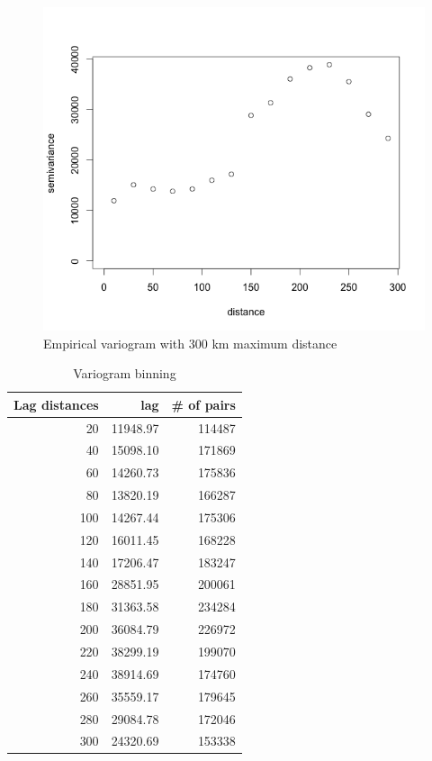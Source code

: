 \documentclass[12pt,twoside]{reedthesis}
\begin{document}
\begin{figure}[h!]
	   
	       \centering
	  
	    \includegraphics[scale=0.6]{Variogram}
	
	     \caption{Empirical variogram with 300 km maximum distance}
	 \label{variogram}
	\end{figure}

\begin{table}[h]

\centering

\begin{tabular}{r|r|r}
\hline
Lag distances & lag & \# of pairs\\
\hline
20 & 11948.97 & 114487\\
\hline
40 & 15098.10 & 171869\\
\hline
60 & 14260.73 & 175836\\
\hline
80 & 13820.19 & 166287\\
\hline
100 & 14267.44 & 175306\\
\hline
120 & 16011.45 & 168228\\
\hline
140 & 17206.47 & 183247\\
\hline
160 & 28851.95 & 200061\\
\hline
180 & 31363.58 & 234284\\
\hline
200 & 36084.79 & 226972\\
\hline
220 & 38299.19 & 199070\\
\hline
240 & 38914.69 & 174760\\
\hline
260 & 35559.17 & 179645\\
\hline
280 & 29084.78 & 172046\\
\hline
300 & 24320.69 & 153338\\
\hline
\end{tabular}

\caption{Variogram binning}
\label{bins}

\end{table}
\end{document}

